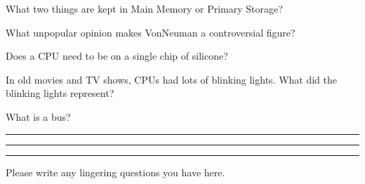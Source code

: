 \documentclass[letterpaper,12pt]{exam}
\begin{document}
\begin{questions}
 \begin{samepage}
     \question What two things are kept in Main Memory or Primary Storage?
     \vspace{5mm}
 \end{samepage}
 \par
 \begin{samepage}
     \question What unpopular opinion makes VonNeuman a controversial figure?
     \vspace{5mm}
 \end{samepage}
 \par
  \begin{samepage}
      \question Does a CPU need to be on a single chip of silicone?
      \vspace{5mm}
  \end{samepage}
  \par
   \begin{samepage}
       \question In old movies and TV shows, CPUs had lots of blinking lights.  What did the blinking lights represent?
       \vspace{5mm}
   \end{samepage}
   \par
   \begin{samepage}
       \question What is a bus?
       \vspace{5mm}
   \end{samepage}
   \par
    
  
\rule{0.5\textwidth}{.4pt} %

\par
\rule{0.5\textwidth}{.4pt} %
\begin{center}
    \rule{0.5\textwidth}{.4pt}
\end{center}
Please write any lingering questions you have here.
\end{questions}
\end{document}

